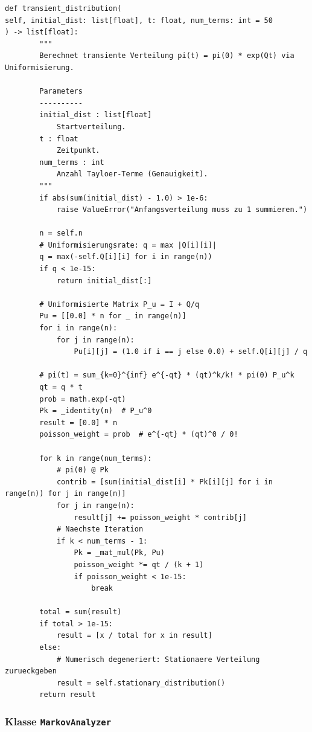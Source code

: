 ﻿\documentclass[a4paper,12pt]{scrreprt}
\theoremstyle{definition}
\begin{document}
\begin{lstlisting}[style=python, caption={Uniformisierungsverfahren fÃ¼r die transiente Verteilung (Auszug)}, label=lst:uniformization]
def transient_distribution(
self, initial_dist: list[float], t: float, num_terms: int = 50
) -> list[float]:
        """
        Berechnet transiente Verteilung pi(t) = pi(0) * exp(Qt) via Uniformisierung.

        Parameters
        ----------
        initial_dist : list[float]
            Startverteilung.
        t : float
            Zeitpunkt.
        num_terms : int
            Anzahl Tayloer-Terme (Genauigkeit).
        """
        if abs(sum(initial_dist) - 1.0) > 1e-6:
            raise ValueError("Anfangsverteilung muss zu 1 summieren.")

        n = self.n
        # Uniformisierungsrate: q = max |Q[i][i]|
        q = max(-self.Q[i][i] for i in range(n))
        if q < 1e-15:
            return initial_dist[:]

        # Uniformisierte Matrix P_u = I + Q/q
        Pu = [[0.0] * n for _ in range(n)]
        for i in range(n):
            for j in range(n):
                Pu[i][j] = (1.0 if i == j else 0.0) + self.Q[i][j] / q

        # pi(t) = sum_{k=0}^{inf} e^{-qt} * (qt)^k/k! * pi(0) P_u^k
        qt = q * t
        prob = math.exp(-qt)
        Pk = _identity(n)  # P_u^0
        result = [0.0] * n
        poisson_weight = prob  # e^{-qt} * (qt)^0 / 0!

        for k in range(num_terms):
            # pi(0) @ Pk
            contrib = [sum(initial_dist[i] * Pk[i][j] for i in range(n)) for j in range(n)]
            for j in range(n):
                result[j] += poisson_weight * contrib[j]
            # Naechste Iteration
            if k < num_terms - 1:
                Pk = _mat_mul(Pk, Pu)
                poisson_weight *= qt / (k + 1)
                if poisson_weight < 1e-15:
                    break

        total = sum(result)
        if total > 1e-15:
            result = [x / total for x in result]
        else:
            # Numerisch degeneriert: Stationaere Verteilung zurueckgeben
            result = self.stationary_distribution()
        return result
\end{lstlisting}

\subsubsection{Klasse \texttt{MarkovAnalyzer}}
\end{document}
